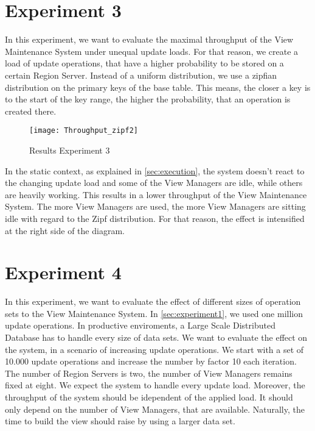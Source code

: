 \documentclass[11pt,a4paper,bibtotoc,idxtotoc,headsepline,footsepline,footexclude,BCOR12mm,DIV13]{scrbook}
\begin{document}
\section{Experiment 3}
\label{sec:experiment3}

In this experiment, we want to evaluate the maximal throughput of the View Maintenance System under unequal update loads. For that reason, we create a load of update operations, that have a higher probability to be stored on a certain Region Server. Instead of a uniform distribution, we use a zipfian distribution on the primary keys of the base table. This means, the closer a key is to the start of the key range, the higher the probability, that an operation is created there.

\begin{figure}[h!]
  
  \centering
    \texttt{[image: Throughput\_zipf2]}
    \caption{Results Experiment 3}
    \label{fig:throughput}
\end{figure}

In the static context, as explained in \ref{sec:execution}, the system doesn't react to the changing update load and some of the View Managers are idle, while others are heavily working. This results in a lower throughput of the View Maintenance System. The more View Managers are used, the more View Managers are sitting idle with regard to the Zipf distribution. For that reason, the effect is intensified at the right side of the diagram.




\section{Experiment 4}
\label{sec:experiment4}


In this experiment, we want to evaluate the effect of different sizes of operation sets to the View Maintenance System. In \ref{sec:experiment1}, we used one million update operations. In productive enviroments, a Large Scale Distributed Database has to handle every size of data sets. We want to evaluate the effect on the system, in a scenario of increasing update operations. We start with a set of 10.000 update operations and increase the number by factor 10 each iteration. The number of Region Servers is two, the number of View Managers remains fixed at eight. We expect the system to handle every update load. Moreover, the throughput of the system should be idependent of the applied load. It should only depend on the number of View Managers, that are available. Naturally, the time to build the view should raise by using a larger data set.
\end{document}

